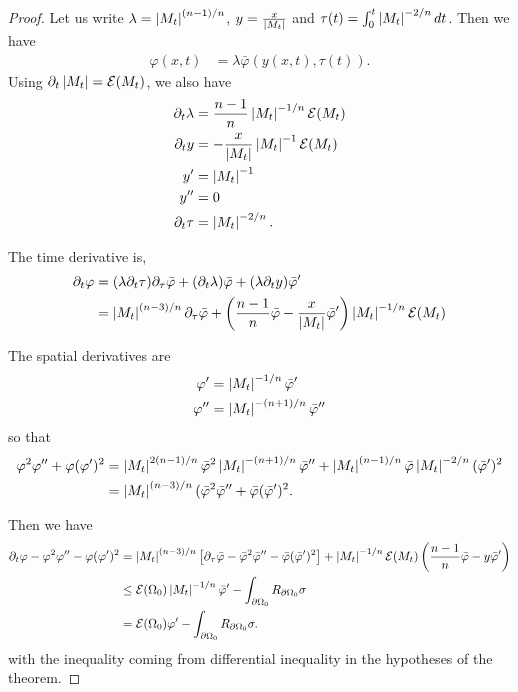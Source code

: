 \documentclass{amsart}
\begin{document}
\begin{proof}
Let us write \(\lambda = \left|{M_t}\right|^{(n-1)/n}\), \(y = \frac{x}{\left|{M_t}\right|}\) and \(\tau(t) = \int_0^t \left|{M_t}\right|^{-2/n} dt\). Then we have
\[
\begin{split}
\varphi(x, t) &= \lambda \bar{\varphi} (y(x,t), \tau(t)).
\end{split}
\]
Using \(\partial_t \left|{M_t}\right| = \operatorname{\mathcal{E}}(M_t)\), we also have
\begin{align*}
\partial_t \lambda &= \frac{n-1}{n} \left|{M_t}\right|^{-1/n} \operatorname{\mathcal{E}}(M_t) \\
\partial_t y &= -\frac{x}{\left|{M_t}\right|} \left|{M_t}\right|^{-1} \operatorname{\mathcal{E}}(M_t) \\
y' &= \left|{M_t}\right|^{-1} \\
y'' &= 0 \\
\partial_t \tau &= \left|{M_t}\right|^{-2/n}.
\end{align*}

The time derivative is,
\[
\begin{split}
\partial_t \varphi &= (\lambda \partial_t \tau) \partial_{\tau} \bar{\varphi} + (\partial_t \lambda) \bar{\varphi} + (\lambda \partial_t y) \bar{\varphi}' \\
&= \left|{M_t}\right|^{(n-3)/n} \partial_{\tau} \bar{\varphi} + \left(\frac{n-1}{n} \bar{\varphi} - \frac{x}{\left|{M_t}\right|} \bar{\varphi}'\right) \left|{M_t}\right|^{-1/n} \operatorname{\mathcal{E}}(M_t)
\end{split}
\]

The spatial derivatives are
\begin{align*}
\varphi' &= \left|{M_t}\right|^{-1/n} \bar{\varphi}' \\
\varphi'' &= \left|{M_t}\right|^{-(n+1)/n} \bar{\varphi}''
\end{align*}
so that
\[
\begin{split}
\varphi^2 \varphi'' + \varphi(\varphi')^2 &= \left|{M_t}\right|^{2(n-1)/n} \bar{\varphi}^2 \left|{M_t}\right|^{-(n+1)/n} \bar{\varphi}'' + \left|{M_t}\right|^{(n-1)/n} \bar{\varphi} \left|{M_t}\right|^{-2/n} (\bar{\varphi}')^2 \\
&= \left|{M_t}\right|^{(n-3)/n} (\bar{\varphi}^2 \bar{\varphi}'' + \bar{\varphi}(\bar{\varphi}')^2.
\end{split}
\]

Then we have
\begin{equation}
\label{eq:scaled_diff_ineq}
\begin{split}
\partial_t \varphi - \varphi^2 \varphi'' - \varphi(\varphi')^2 &= \left|{M_t}\right|^{(n-3)/n}\left[ \partial_{\tau} \bar{\varphi} -\bar{\varphi}^2 \bar{\varphi}'' - \bar{\varphi}(\bar{\varphi}')^2\right] + \left|{M_t}\right|^{-1/n} \operatorname{\mathcal{E}}(M_t) \left(\frac{n-1}{n} \bar{\varphi} - y\bar{\varphi}'\right) \\
&\leq \operatorname{\mathcal{E}}(\Omega_0) \left|{M_t}\right|^{-1/n} \bar{\varphi}' - \int_{\partial {\Omega_0}} R_{\partial {\Omega_0}}\sigma \\
&= \operatorname{\mathcal{E}}(\Omega_0) \varphi' - \int_{\partial {\Omega_0}} R_{\partial {\Omega_0}}\sigma.
\end{split}
\end{equation}
with the inequality coming from differential inequality in the hypotheses of the theorem.


\end{proof}
\end{document}
